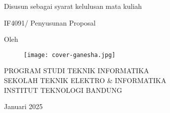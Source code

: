 \clearpage
\pagestyle{empty}

\begin{center}
    \smallskip

    \Large \bfseries \MakeUppercase{\thetitle}
    \vfill


    \large Disusun sebagai syarat kelulusan mata kuliah

    \large IF4091/ Penyusunan Proposal
    \vfill

    \large Oleh

    \Large \theauthor

    \vfill
    \begin{figure}[htbp]
        \centering
        \texttt{[image: cover-ganesha.jpg]}
    \end{figure}
    \vfill

    \large
    \uppercase{
        Program Studi Teknik Informatika \\
        Sekolah Teknik Elektro \& Informatika \\
        Institut Teknologi Bandung
    }

    Januari 2025

\end{center}

\clearpage
